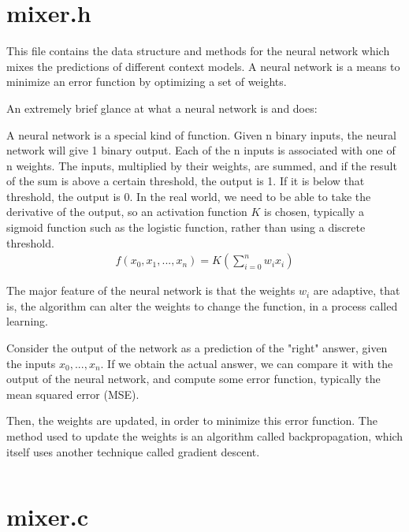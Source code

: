 \documentclass[10pt, fleqn]{article}
\theoremstyle{break}
\newcommand{\0}    {\mathbf{0}}
\numberwithin{equation}{section}
\begin{document}
\pagebreak
\section{mixer.h}
\begin{snugshade}
This file contains the data structure and methods for the neural network which
mixes the predictions of different context models. A neural network is a means
to minimize an error function by optimizing a set of weights.

An extremely brief glance at what a neural network is and does:

A neural network is a special kind of function. Given n binary inputs, the 
neural network will give 1 binary output. Each of the n inputs is associated
with one of n weights. The inputs, multiplied by their weights, are summed,
and if the result of the sum is above a certain threshold, the output is 1.
If it is below that threshold, the output is 0. In the real world, we need
to be able to take the derivative of the output, so an activation function
$K$ is chosen, typically a sigmoid function such as the logistic function,
rather than using a discrete threshold.
\begin{align*}
        f(x_0,x_1,...,x_n) = K(\sum_{i=0}^n w_ix_i)
\end{align*}

The major feature of the neural network is that the weights $w_i$ are adaptive,
that is, the algorithm can alter the weights to change the function, in a 
process called learning. 

Consider the output of the network as a prediction of the "right" answer,
given the inputs $x_0,...,x_n$. If we obtain the actual answer, we can compare
it with the output of the neural network, and compute some error function,
typically the mean squared error (MSE).

Then, the weights are updated, in order to minimize this error function.
The method used to update the weights is an algorithm called backpropagation,
which itself uses another technique called gradient descent.
\end{snugshade}
\inputminted[mathescape,
               linenos,
               firstnumber=last,
               numbersep=5pt,
               gobble=0,
               frame=none,
               fontsize=\small,
               framesep=2mm]{c}{../mixer.h}
\section{mixer.c}
\begin{multicols}{2}
\inputminted[mathescape,
               linenos,
               firstnumber=last,
               numbersep=5pt,
               gobble=0,
               frame=none,
               fontsize=\tiny,
               framesep=2mm]{c}{../mixer.c}
\end{multicols}
\end{document}
